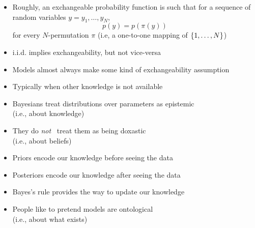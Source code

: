 \documentclass[10pt]{report}
\begin{document}

\begin{itemize}
\item Roughly, an exchangeable probability function is such that for
a sequence of random variables $y = y_1,\ldots,y_N$,
\[
p(y) = p(\pi(y))
\]
for every $N$-permutation $\pi$ (i.e, a one-to-one mapping of $\{ 1,\ldots,N \}$)
\item i.i.d. implies exchangeability, but not vice-versa
\end{itemize}

%
\begin{itemize}
\item Models almost always make some kind of exchangeability assumption
\item Typically when other knowledge is not available
\end{itemize}


\begin{itemize}
\item Bayesians treat distributions over parameters as epistemic \\
(i.e., about knowledge) 
\item They do \emph{not} \ treat them as being doxastic \\
(i.e., about beliefs)
\item Priors encode our knowledge before seeing the data
\item Posteriors encode our knowledge after seeing the data
\item Bayes's rule provides the way to update our knowledge
\item People like to pretend models are ontological \\
(i.e., about what exists)
\end{itemize}
\end{document}
